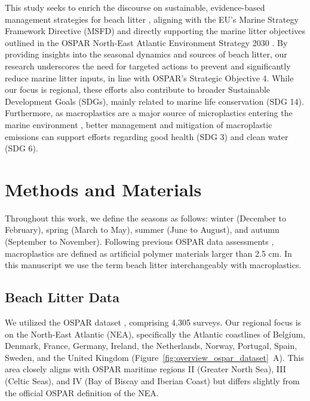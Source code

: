 This study seeks to enrich the discourse on sustainable, evidence-based management strategies for beach litter \cite{likens_role_2010,van_loon_european_2020}, aligning with the EU's Marine Strategy Framework Directive (MSFD) and directly supporting the marine litter objectives outlined in the OSPAR North-East Atlantic Environment Strategy 2030 \cite{ospar_comission_strategy_2021}. By providing insights into the seasonal dynamics and sources of beach litter, our research underscores the need for targeted actions to prevent and significantly reduce marine litter inputs, in line with OSPAR's Strategic Objective 4. While our focus is regional, these efforts also contribute to broader Sustainable Development Goals (SDGs), mainly related to marine life conservation (SDG 14). Furthermore, as macroplastics are a major source of microplastics entering the marine environment \cite{strokal_river_2023}, better management and mitigation of macroplastic emissions can support efforts regarding good health (SDG 3) and clean water (SDG 6).

\section{Methods and Materials}\label{sec:plastics:methods}
Throughout this work, we define the seasons as follows: winter (December to February), spring (March to May), summer (June to August), and autumn (September to November). Following previous OSPAR data assessments \cite{lacroix_abundance_2023}, macroplastics are defined as artificial polymer materials larger than 2.5 cm. In this manuscript we use the term beach litter interchangeably with macroplastics.


\subsection{Beach Litter Data}\label{sec:plastics:methods:ospar}
We utilized the OSPAR dataset \cite{ospar_comission_convention_1992,lacroix_abundance_2023}, comprising 4,305 surveys. Our regional focus is on the North-East Atlantic (NEA), specifically the Atlantic coastlines of Belgium, Denmark, France, Germany, Ireland, the Netherlands, Norway, Portugal, Spain, Sweden, and the United Kingdom (Figure~\ref{fig:overview_ospar_dataset}~A). This area closely aligns with OSPAR maritime regions II (Greater North Sea), III (Celtic Seas), and IV (Bay of Biscay and Iberian Coast) but differs slightly from the official OSPAR definition of the NEA.

